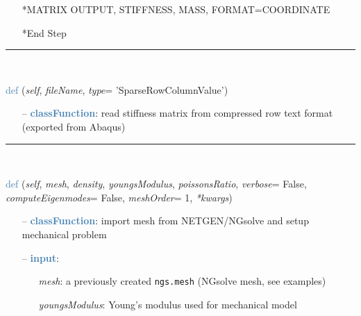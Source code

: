 \begin{itemize}[leftmargin=1.4cm]
\begin{itemize}[leftmargin=1.4cm]
\begin{itemize}[leftmargin=0.5cm]
\begin{itemize}[leftmargin=1.4cm]
\begin{itemize}[leftmargin=1.4cm]
\begin{itemize}[leftmargin=0.5cm]
\begin{itemize}[leftmargin=0.7cm]
\begin{itemize}[leftmargin=1.2cm]
    \item[] *MATRIX OUTPUT, STIFFNESS, MASS, FORMAT=COORDINATE
    \item[] *End Step
  \end{itemize}
\vspace{12pt}\end{itemize}
%
\noindent\rule{8cm}{0.75pt}\vspace{1pt} \\ 
\begin{flushleft}
\noindent \textcolor{steelblue}{def {\bf {}}}\label{sec:FEM:FEMinterface:ReadStiffnessMatrixFromAbaqus}
({\it self}, {\it fileName}, {\it type}= 'SparseRowColumnValue')
\end{flushleft}
\setlength{\itemindent}{0.7cm}
\begin{itemize}[leftmargin=0.7cm]
  \item[--]  \textcolor{steelblue}{\bf classFunction}: read stiffness matrix from compressed row text format (exported from Abaqus)\vspace{12pt}\end{itemize}
%
\noindent\rule{8cm}{0.75pt}\vspace{1pt} \\ 
\begin{flushleft}
\noindent \textcolor{steelblue}{def {\bf {}}}\label{sec:FEM:FEMinterface:ImportMeshFromNGsolve}
({\it self}, {\it mesh}, {\it density}, {\it youngsModulus}, {\it poissonsRatio}, {\it verbose}= False, {\it computeEigenmodes}= False, {\it meshOrder}= 1, {\it **kwargs})
\end{flushleft}
\setlength{\itemindent}{0.7cm}
\begin{itemize}[leftmargin=0.7cm]
  \item[--]  \textcolor{steelblue}{\bf classFunction}: import mesh from NETGEN/NGsolve and setup mechanical problem  \item[--]  \textcolor{steelblue}{\bf input}: \vspace{-6pt}
  \begin{itemize}[leftmargin=1.2cm]
\setlength{\itemindent}{-0.7cm}
    \item[] {\it mesh}: a previously created \texttt{ngs.mesh} (NGsolve mesh, see examples)
    \item[] {\it     youngsModulus}: Young's modulus used for mechanical model

\end{itemize}
\end{itemize}
\end{itemize}
\end{itemize}
\end{itemize}
\end{itemize}
\end{itemize}
\end{itemize}
